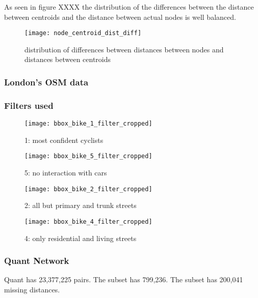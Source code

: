 As seen in figure XXXX the distribution of the differences between the distance between centroids and the distance between actual nodes is well balanced. 

\begin{figure}
\centering
\texttt{[image: node\_centroid\_dist\_diff]}
\caption{distribution of differences between distances between nodes and distances between centroids}
\label{table:dist_diffs}
\end{figure}

\subsubsection{London's OSM data}

\subsubsection{Filters used}

\begin{figure}
  \centering
  \texttt{[image: bbox\_bike\_1\_filter\_cropped]}
  \caption{1: most confident cyclists}
  \label{fig:sub1}
\end{figure}

\begin{figure}
  \centering
  \texttt{[image: bbox\_bike\_5\_filter\_cropped]}
  \caption{5: no interaction with cars }
  \label{fig:sub2}
\end{figure}



\begin{figure}
  \centering
  \texttt{[image: bbox\_bike\_2\_filter\_cropped]}
  \caption{2: all but primary and trunk streets}
  \label{fig:sub2}
\end{figure}



\begin{figure}
  \centering
  \texttt{[image: bbox\_bike\_4\_filter\_cropped]}
  \caption{4: only residential and living streets}
  \label{fig:sub2}
\end{figure}


\subsubsection{Quant Network}

Quant has 23,377,225 pairs. The subset has 799,236. The subset has 200,041 missing distances. 


